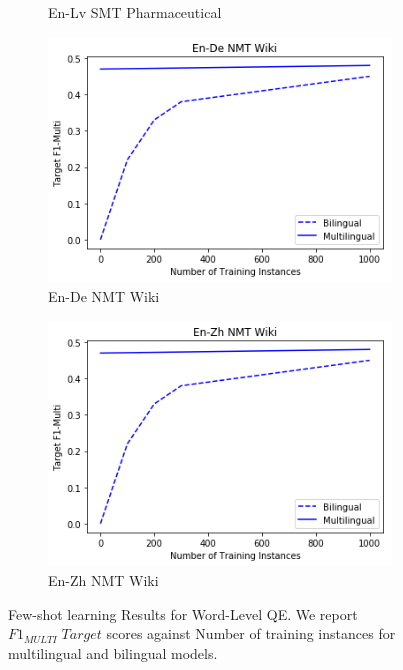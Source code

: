 \begin{figure}
\begin{subfigure}[b]{\figlength}
		\caption{En-Lv SMT Pharmaceutical}
		\label{fig:en_lv_smt_pharm_results}
	\end{subfigure}
	\begin{subfigure}[b]{\figlength}
		\centering\includegraphics[width=\figlength]{figures/translation_quality_estimation/word_level/en_de_nmt_wiki.png}
		\caption{En-De NMT Wiki}
		\label{fig:en_de_nmt_wiki_results}
	\end{subfigure}
	\begin{subfigure}[b]{\figlength}
		\centering\includegraphics[width=\figlength]{figures/translation_quality_estimation/word_level/en_zh_nmt_wiki.png}
		\caption{En-Zh NMT Wiki}
		\label{fig:en_zh_nmt_wiki_results}
	\end{subfigure}
	\caption[Few-shot learning Results for Word-Level QE]{Few-shot learning Results for Word-Level QE. We report $F1_{\textit{MULTI}} \; Target$ scores against Number of training instances for multilingual and bilingual models.}
	\label{fig:fewshot_results}
\end{figure}

